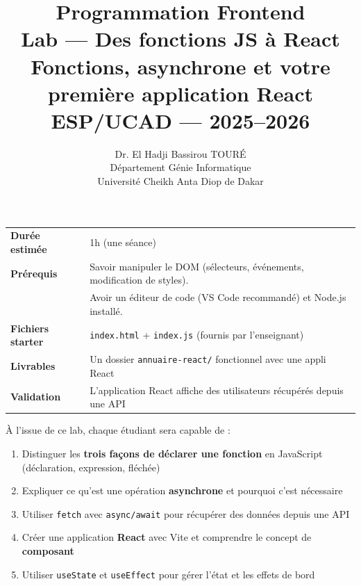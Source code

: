 \documentclass[11pt,a4paper]{article}
\title{%
\vspace{-1cm}
\textbf{\LARGE Programmation Frontend}\\[0.8cm]
\textbf{\huge Lab --- Des fonctions JS à React}\\[0.3cm]
\textbf{\Large Fonctions, asynchrone et votre première application React}\\[0.5cm]
\large ESP/UCAD --- 2025--2026}
\author{Dr. El Hadji Bassirou TOURÉ\\
Département Génie Informatique\\
Université Cheikh Anta Diop de Dakar}
\date{}
\begin{document}
\maketitle
\thispagestyle{empty}

\vspace{0.5cm}

\begin{prereqbox}
\begin{center}
\begin{tabular}{ll}
\toprule
\textbf{Durée estimée} & 1h (une séance) \\
\textbf{Prérequis} & Savoir manipuler le DOM (sélecteurs, événements, modification de styles). \\
                    & Avoir un éditeur de code (VS Code recommandé) et Node.js installé. \\
\textbf{Fichiers starter} & \texttt{index.html} + \texttt{index.js} (fournis par l'enseignant) \\
\textbf{Livrables} & Un dossier \texttt{annuaire-react/} fonctionnel avec une appli React \\
\textbf{Validation} & L'application React affiche des utilisateurs récupérés depuis une API \\
\bottomrule
\end{tabular}
\end{center}
\end{prereqbox}

\begin{objectifbox}
À l'issue de ce lab, chaque étudiant sera capable de :
\begin{enumerate}[nosep]
    \item Distinguer les \textbf{trois façons de déclarer une fonction} en JavaScript (déclaration, expression, fléchée)
    \item Expliquer ce qu'est une opération \textbf{asynchrone} et pourquoi c'est nécessaire
    \item Utiliser \texttt{fetch} avec \texttt{async/await} pour récupérer des données depuis une API
    \item Créer une application \textbf{React} avec Vite et comprendre le concept de \textbf{composant}
    \item Utiliser \texttt{useState} et \texttt{useEffect} pour gérer l'état et les effets de bord
\end{enumerate}
\end{objectifbox}
\end{document}
